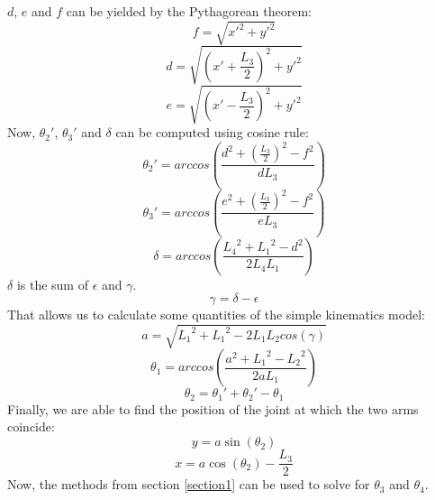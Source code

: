 \documentclass[11pt, oneside]{article}   %
\begin{document}
$d$, $e$ and $f$ can be yielded by the Pythagorean theorem:
\begin{equation}
f = \sqrt{{x'}^2 + {y'}^2}
\label{eqn:f}
\end{equation}
\begin{equation}
d = \sqrt{\left(x'+ \frac{L_3}{2}\right)^2 + {y'}^2}
\end{equation}
\begin{equation}
e = \sqrt{\left(x'- \frac{L_3}{2}\right)^2 + {y'}^2}
\end{equation}
Now, $\theta_2'$, $\theta_3'$ and $\delta$ can be computed using cosine rule:
\begin{equation}
\theta_2' = arccos\left(  \frac{d^2 + (\frac{L_3}{2})^2 - f^2}{dL_3} \right)
\label{eqn:theta2prime}
\end{equation}
\begin{equation}
\theta_3' = arccos\left(  \frac{e^2 + (\frac{L_3}{2})^2 - f^2}{eL_3} \right)
\label{eqn:theta3prime}
\end{equation}
\begin{equation}
\delta = arccos\left(  \frac{{L_4}^2 + {L_1}^2 - d^2}{2L_4L_1} \right)
\label{eqn:delta}
\end{equation}
$\delta$ is the sum of $\epsilon$ and $\gamma$.
\begin{equation}
\gamma = \delta - \epsilon
\end{equation}
That allows us to calculate some quantities of the simple kinematics model:
\begin{equation}
a = \sqrt{{L_1}^2 + {L_1}^2 - 2L_1L_2cos\left(\gamma\right)}
\end{equation}
\begin{equation}
\theta_1 = arccos\left(  \frac{a^2 + {L_1}^2 - {L_2}^2}{2aL_1} \right)
\end{equation}
\begin{equation}
\theta_2 = \theta_1' + \theta_2' - \theta_1
\end{equation}
Finally, we are able to find the position of the joint at which the two arms coincide:
\begin{equation}
	y = a \sin(\theta_2)
\end{equation}
\begin{equation}
	x = a\cos(\theta_2) - \frac{L_3}{2}
\end{equation}
Now, the methods from section \ref{section1} can be used to solve for $\theta_3$ and $\theta_4$.
\end{document}
